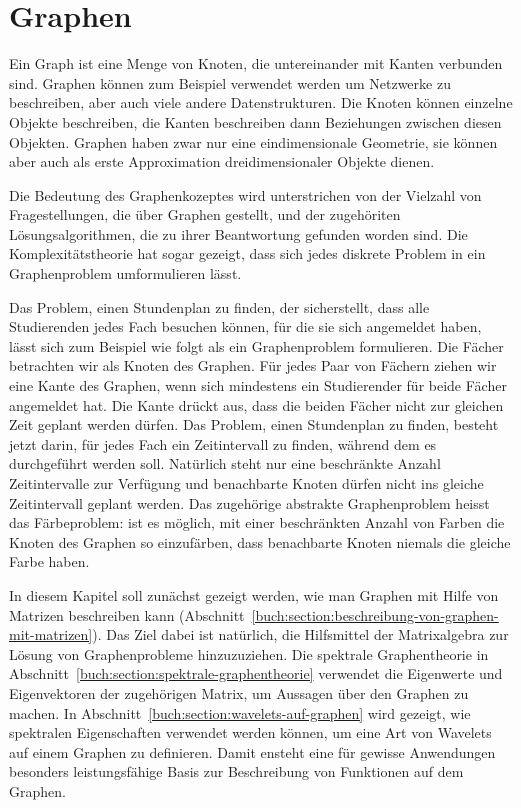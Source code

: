 %
%
%
\chapter{Graphen
\label{buch:chapter:graphen}}
\rhead{}
Ein Graph ist eine Menge von Knoten, die untereinander mit Kanten
verbunden sind.
Graphen können zum Beispiel verwendet werden um Netzwerke zu beschreiben,
aber auch viele andere Datenstrukturen.
%
Die Knoten können einzelne Objekte beschreiben, die Kanten beschreiben
dann Beziehungen zwischen diesen Objekten.
Graphen haben zwar nur eine eindimensionale Geometrie, sie können aber auch als
erste Approximation dreidimensionaler Objekte dienen.

Die Bedeutung des Graphenkozeptes wird unterstrichen von der Vielzahl
von Fragestellungen, die über Graphen gestellt, und der
zugehöriten Lösungsalgorithmen, die zu ihrer Beantwortung gefunden
worden sind.
Die Komplexitätstheorie hat sogar gezeigt, dass sich jedes diskrete
Problem in ein Graphenproblem umformulieren lässt.
%

Das Problem, einen Stundenplan zu finden, der sicherstellt, dass
alle Studierenden jedes Fach besuchen können, für die sie sich
angemeldet haben, lässt sich zum Beispiel wie folgt als ein
Graphenproblem formulieren.
Die Fächer betrachten wir als Knoten des Graphen.
Für jedes Paar von Fächern ziehen wir eine Kante des Graphen, wenn 
sich mindestens ein Studierender für beide Fächer angemeldet hat.
Die Kante drückt aus, dass die beiden Fächer nicht zur gleichen Zeit
geplant werden dürfen.
Das Problem, einen Stundenplan zu finden, besteht jetzt darin, für
jedes Fach ein Zeitintervall zu finden, während dem es durchgeführt
werden soll.
%
Natürlich steht nur eine beschränkte Anzahl Zeitintervalle zur Verfügung
und benachbarte Knoten dürfen nicht ins gleiche Zeitintervall geplant
werden.
Das zugehörige abstrakte Graphenproblem heisst das Färbeproblem: 
%
ist es möglich, mit einer beschränkten Anzahl von Farben die Knoten
des Graphen so einzufärben, dass benachbarte Knoten niemals die gleiche
Farbe haben.

In diesem Kapitel soll zunächst gezeigt werden, wie man Graphen mit 
Hilfe von Matrizen beschreiben kann
(Abschnitt~\ref{buch:section:beschreibung-von-graphen-mit-matrizen}).
Das Ziel dabei ist natürlich, die Hilfsmittel der Matrixalgebra
zur Lösung von Graphenprobleme hinzuzuziehen.
Die spektrale Graphentheorie in
Abschnitt~\ref{buch:section:spektrale-graphentheorie} verwendet
die Eigenwerte und Eigenvektoren der zugehörigen Matrix, um Aussagen
über den Graphen zu machen.
%
In Abschnitt~\ref{buch:section:wavelets-auf-graphen} wird gezeigt,
wie spektralen Eigenschaften verwendet werden können, um eine
Art von Wavelets auf einem Graphen zu definieren.
Damit ensteht eine für gewisse Anwendungen besonders leistungsfähige
Basis zur Beschreibung von Funktionen auf dem Graphen.






